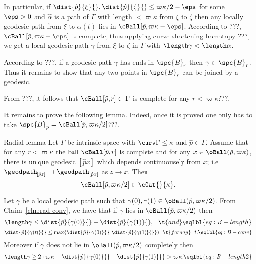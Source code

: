 In particular,
if $\dist{\hat p}{\xi}{},\dist{\hat p}{\zeta}{}\le \varpi\kappa/2-\eps$  for some $\eps>0$
and $\hat\alpha$ is a path of $\Gamma$ with length $<\varpi\kappa$ from $\xi$ to $\zeta$ 
then any locally geodesic path from $\xi$ to $\alpha(t)$ lies in 
$\cBall[\hat p,\varpi\kappa-\eps]$.
According to ???, $\cBall[\hat p,\varpi\kappa-\eps]$ is complete, 
thus applying curve-shortening homotopy ???, 
we get a local geodesic path $\gamma$ from $\xi$ to $\zeta$ in $\Gamma$ with 
$\length \gamma<\length\alpha$.

According to ???, if a geodesic path $\gamma$ has ends in $\spc{B}_r$ then $\gamma\subset\spc{B}_r$.
Thus it remains to show that any two points in $\spc{B}_r$ can be joined by a geodesic.








From ???, it follows that $\cBall[\hat p,r]\subset\Gamma$ is complete for any $r<\varpi\kappa???$.

It remains to prove the following lemma.
Indeed, once it is proved one only has to take $\spc{B}_p=\cBall[\hat p,\varpi\kappa/2]$???.


\begin{thm}{Radial lemma}
Let $\Gamma$ be intrinsic space with $\curv\Gamma\le\kappa$
and $\hat p\in\Gamma$.
Assume that 
for any $r<\varpi\kappa$ the ball $\cBall[\hat p,r]$ is complete
and for any $x\in\oBall(\hat p,\varpi\kappa)$,
 there is unique geodesic $[\hat p x]$ which depends continuousely from $x$;
i.e. $\geodpath_{[\hat p z]}\rightrightarrows\geodpath_{[\hat p x]}$ as $z\to x$.
Then 
$$\cBall[\hat p,\varpi\kappa/2]\in\cCat{}{\kappa}.$$

\end{thm}





Let $\gamma$ be a local geodesic path such that $\gamma(0),\gamma(1)\in \oBall(\hat p,\varpi\kappa/2)$.
From Claim~\ref{clm:rad-conv}, we have that 
if $\gamma$ lies in $\oBall(\hat p,\varpi\kappa/2)$  
then
$$\length\gamma\le \dist{\hat p}{\gamma(0)}{}+\dist{\hat p}{\gamma(1)}{},\ \ \t{and}
\eqlbl{eq:B-length}$$
$$\dist{\hat p}{\gamma(t)}{}\le\max\{\dist{\hat p}{\gamma(0)}{},\dist{\hat p}{\gamma(1)}{}\})
\ \ \t{for any}\ \ 
t.
\eqlbl{eq:B-conv}$$ 
Moreover if $\gamma$ does not lie in $\oBall(\hat p,\varpi\kappa/2)$ completely then
$$\length\gamma\ge2\cdot\varpi\kappa- \dist{\hat p}{\gamma(0)}{}-\dist{\hat p}{\gamma(1)}{}>\varpi\kappa.
\eqlbl{eq:B-length2}$$

